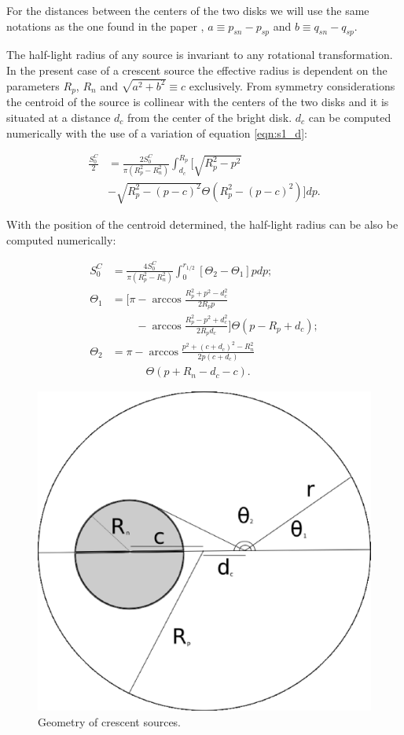 \documentclass[usenatbib]{mn2e}
\begin{document}
For the distances between the centers of the two disks we will use the same notations as the one found in the paper \citep{2013MNRAS.434..765K}, $a \equiv p_{sn} - p_{sp}$ and $b \equiv q_{sn} - q_{sp}$.

The half-light radius of any source is invariant to any rotational transformation. In the present case of a crescent source the effective radius is dependent on the parameters $R_p$, $R_n$ and $\sqrt{a^2+b^2}\equiv c $ exclusively. From symmetry considerations the centroid of the source is collinear with the centers of the two disks and it is situated at a distance $d_c$ from the center of the bright disk. $d_c$ can be computed numerically with the use of a variation of equation \ref{eqn:s1_d}:

\begin{equation}
\begin{aligned}
\frac{S_0^C}{2} & = \frac{2 S_0^C}{\pi \left(R_p^2-R_n^2 \right)} \int_{d_c}^{R_p} \bigg[ \sqrt{R_p^2 - p^2} \\ 
		& - \sqrt{R_p^2 - \left(p-c\right)^2} \Theta \left(R_p^2 - \left(p-c\right)^2 \right) \bigg] dp. 
\end{aligned}
\end{equation}   

With the position of the centroid determined, the half-light radius can be also be computed numerically:
 
\begin{equation}
\begin{aligned}
S_0^C &=  \frac{4S_0^C}{\pi \left(R_p^2-R_n^2 \right)} \int_{0}^{r_{1/2}} \left[ \Theta_2  - \Theta_1  \right] p dp; \\
\Theta_1 &= \bigg[ \pi - \arccos \frac{R_p^2 + p^2 -d_c^2}{2 R_p p} \\
         & \phantom{= \bigg[ \pi} - \arccos \frac{R_p^2 - p^2 + d_c^2}{2 R_p d_c}
            \bigg] \Theta \left( p - R_p + d_c \right); \\
\Theta_2 &=  \pi - \arccos \frac{ p^2  + (c+d_c)^2 - R_n^2}
                                {2 p \left(c + d_c \right)} \\
         & \phantom{= \pi - } \Theta \left( p + R_n - d_c -c \right). 
\end{aligned}
\end{equation}

\begin{figure}
\includegraphics[width = .49\textwidth]{figures/figure_rhalf.eps}
\caption{\label{fig:geom_crescent} Geometry of crescent sources.}
\end{figure}
\end{document}
